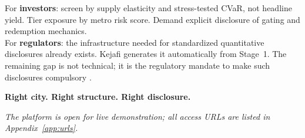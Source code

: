 \documentclass[11pt,letterpaper]{article}
\begin{document}
\begin{tcolorbox}[colback=lightgray,colframe=kejafiDark,
  title=\textbf{Key Message},coltitle=white,colbacktitle=kejafiDark]
For \textbf{investors}: screen by supply elasticity \citep{saiz2010} and stress-tested
CVaR, not headline yield. Tier exposure by metro risk score. Demand explicit disclosure
of gating and redemption mechanics.\\[4pt]
For \textbf{regulators}: the infrastructure needed for standardized quantitative
disclosures already exists. Kejafi generates it automatically from Stage~1. The remaining
gap is not technical; it is the regulatory mandate to make such disclosures compulsory
\citep{bis2025}.
\end{tcolorbox}

\vspace{0.5cm}
\begin{center}
\textcolor{kejafi}{\textbf{\large Right city. Right structure. Right disclosure.}}
\end{center}

\vspace{0.3cm}
\noindent\textit{The platform is open for live demonstration; all access URLs are listed in
Appendix~\ref{app:urls}.}

\newpage

\end{document}
